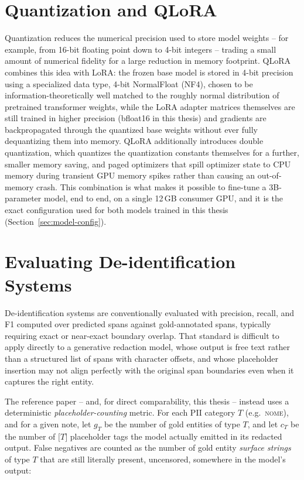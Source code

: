 \documentclass[12pt,a4paper]{report}
\newcommand{\NOME}{\textsc{nome}}
\begin{document}
\section{Quantization and QLoRA}

Quantization reduces the numerical precision used to store model weights -- for example, from 16-bit floating point down to 4-bit integers -- trading a small amount of numerical fidelity for a large reduction in memory footprint. QLoRA \citep{dettmers2023qlora} combines this idea with LoRA: the frozen base model is stored in 4-bit precision using a specialized data type, 4-bit NormalFloat (NF4), chosen to be information-theoretically well matched to the roughly normal distribution of pretrained transformer weights, while the LoRA adapter matrices themselves are still trained in higher precision (bfloat16 in this thesis) and gradients are backpropagated through the quantized base weights without ever fully dequantizing them into memory. QLoRA additionally introduces double quantization, which quantizes the quantization constants themselves for a further, smaller memory saving, and paged optimizers that spill optimizer state to CPU memory during transient GPU memory spikes rather than causing an out-of-memory crash. This combination is what makes it possible to fine-tune a 3B-parameter model, end to end, on a single 12\,GB consumer GPU, and it is the exact configuration used for both models trained in this thesis (Section~\ref{sec:model-config}).

\section{Evaluating De-identification Systems}
\label{sec:eval-metric}

De-identification systems are conventionally evaluated with precision, recall, and F1 computed over predicted spans against gold-annotated spans, typically requiring exact or near-exact boundary overlap. That standard is difficult to apply directly to a generative redaction model, whose output is free text rather than a structured list of spans with character offsets, and whose placeholder insertion may not align perfectly with the original span boundaries even when it captures the right entity.

The reference paper -- and, for direct comparability, this thesis -- instead uses a deterministic \emph{placeholder-counting} metric. For each PII category $T$ (e.g.\ \NOME), and for a given note, let $g_T$ be the number of gold entities of type $T$, and let $c_T$ be the number of $\texttt{[}T\texttt{]}$ placeholder tags the model actually emitted in its redacted output. False negatives are counted as the number of gold entity \emph{surface strings} of type $T$ that are still literally present, uncensored, somewhere in the model's output:
\end{document}
